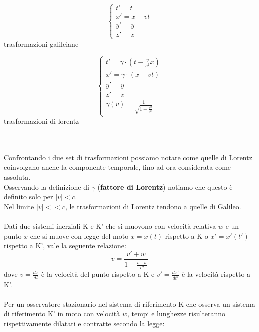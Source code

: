 \documentclass{article}
\begin{document}
\begin{minipage}[c]{.45\columnwidth}
\begin{center}
\begin{equation*}
    \begin{cases}
        t'=t\\
        x'=x-vt\\
        y'=y\\
        z'=z        
    \end{cases}
\end{equation*}
\small trasformazioni galileiane
\end{center}
\end{minipage}
\begin{minipage}[c]{.45\columnwidth}
\begin{center}
\begin{equation*}
    \begin{cases}
        t'=\gamma\cdot(t-\frac{v}{c^2}x)\\
        x'=\gamma\cdot(x-vt)\\
        y'=y\\
        z'=z\\
        \gamma(v)=\frac{1}{\sqrt{1-\frac{v^2}{c^2}}}
    \end{cases}
\end{equation*}
\small trasformazioni di lorentz
\end{center}
\end{minipage}
\\\\
Confrontando i due set di trasformazioni possiamo notare come quelle di Lorentz coinvolgano anche la componente temporale, fino ad ora considerata come assoluta.\\
Osservando la definizione di $\gamma$ (\textbf{fattore di Lorentz}) notiamo che questo è definito solo per $|v|<c$.\\
Nel limite $|v|<<c$, le trasformazioni di Lorentz tendono a quelle di Galileo.\\\\
Dati due sistemi inerziali K e K' che si muovono con velocità relativa $w$ e un punto $x$ che si muove con legge del moto $x=x(t)$ rispetto a K o $x'=x'(t')$ rispetto a K', vale la seguente relazione:
$$ v=\frac{v'+w}{1+\frac{v'\cdot w}{c^2}} $$
dove $v=\frac{dx}{dt}$ è la velocità del punto rispetto a K e $v'=\frac{dx'}{dt'}$ è la velocità rispetto a K'.\\\\
Per un osservatore stazionario nel sistema di riferimento K che osserva un sistema di riferimento K' in moto con velocità $w$, tempi e lunghezze risulteranno rispettivamente dilatati e contratte secondo la legge:
\end{document}
